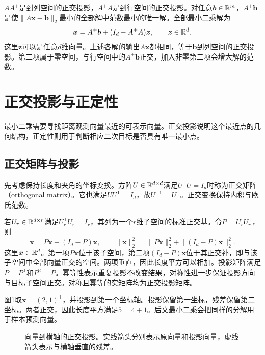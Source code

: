 $AA^+$是到列空间的正交投影，$A^+A$是到行空间的正交投影。对任意$\bm b\in\mathbb{R}^m$，$A^+\bm b$是使$\|A\bm x-\bm b\|_2$最小的全部解中范数最小的唯一解。全部最小二乘解为
\begin{equation}
 \bm x=A^+\bm b+(I_d-A^+A)\bm z,\qquad\bm z\in\mathbb{R}^d.
\end{equation}
这里$\bm z$可以是任意$d$维向量。上述各解的输出$A\bm x$都相同，等于$\bm b$到列空间的正交投影。第二项属于零空间，与行空间中的$A^+\bm b$正交，加入非零第二项会增大解的范数。

\section{正交投影与正定性}
最小二乘需要寻找距离观测向量最近的可表示向量。正交投影说明这个最近点的几何结构，正定性则用于判断相应二次目标是否具有唯一最小点。
\subsection{正交矩阵与投影}
先考虑保持长度和夹角的坐标变换。方阵$U\in\mathbb{R}^{d\times d}$满足$U^{\mathsf T}U=I_d$时称为正交矩阵（orthogonal matrix）。它也满足$UU^{\mathsf T}=I_d$，故$U^{-1}=U^{\mathsf T}$。正交变换保持内积与欧氏范数。

若$U_r\in\mathbb{R}^{d\times r}$满足$U_r^{\mathsf T}U_r=I_r$，其列为一个$r$维子空间的标准正交基。令$P=U_rU_r^{\mathsf T}$，则
\begin{equation}
 \bm x=P\bm x+(I_d-P)\bm x,\qquad
 \|\bm x\|_2^2=\|P\bm x\|_2^2+\|(I_d-P)\bm x\|_2^2.
\end{equation}
这里$\bm x\in\mathbb{R}^d$。第一项$P\bm x$位于该子空间，第二项$(I_d-P)\bm x$位于其正交补，即与该子空间中全部向量正交的空间。两项垂直，因此长度平方可以相加。投影矩阵满足$P=P^{\mathsf T}$和$P^2=P$。幂等性表示重复投影不改变结果，对称性进一步保证投影方向与目标子空间正交。对称且幂等的实矩阵均为正交投影矩阵。

图\ref{fig:math-orthogonal-projection}取$\bm x=(2,1)^{\mathsf T}$，并投影到第一个坐标轴。投影保留第一坐标，残差保留第二坐标。两者正交，因此长度平方满足$5=4+1$。后文最小二乘会把同样的分解用于样本预测向量。
\begin{figure}[htbp]
\centering
{}
\caption{向量到横轴的正交投影。实线箭头分别表示原向量和投影向量，虚线箭头表示与横轴垂直的残差。}
\label{fig:math-orthogonal-projection}
\end{figure}

